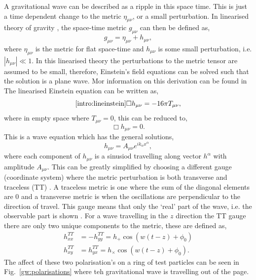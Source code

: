 A gravitational wave can be described as a ripple in this space time.
This is just a time dependent change to the metric $\eta_{\mu\nu}$, or a small perturbation.
In linearised theory of gravity \citep{}, the space-time metric $g_{\mu \nu}$ can then be defined as,
\begin{equation}
    g_{\mu \nu} = \eta_{\mu \nu} + h_{\mu \nu},
\end{equation}
where $ \eta_{\mu \nu}$ is the metric for flat space-time and $h_{\mu \nu}$ is some small perturbation, i.e. $|h_{\mu \nu}| \ll 1$. 
In this linearised theory the perturbations to the metric tensor are assumed to be small, therefore, Einstein's field equations can be solved such that the solution is a plane wave. 
Mor information on this derivation can be found in \citep{Flanagan2005TheTheory,}
The linearised Einstein equation can be written as,
\begin{equation}
\ref{intro:lineinstein}
    \Box h_{\mu \nu} = -16 \pi T_{\mu\nu},
\end{equation}
where in empty space where $T_{\mu \nu} = 0$, this can be reduced to, 
\begin{equation}
    \Box h_{\mu \nu} = 0.
\end{equation}
This is a wave equation which has the general solutions,
\begin{equation}
    h_{\mu\nu} = A_{\mu\nu}e^{ik_{\alpha} x^{\alpha}},
\end{equation}
where each component of $h_{\mu \nu}$ is a sinusiod travelling along vector $h^{\alpha}$ with amplitude $A_{\mu\nu}$.
This can be greatly simplified by choosing a different gauge (coordinate system) where the metric perturbation is both transverse and traceless (TT) \citep{}.
A traceless metric is one where the sum of the diagonal elements are 0 and a transverse metric is when the oscillations are perpendicular to the direction of travel. 
This gauge means that only the `real' part of the wave, i.e. the observable part is shown .
For a wave travelling in the $z$ direction the TT gauge there are only two unique components to the metric, these are defined as,
\begin{equation}
    \begin{split}
        h_{xx}^{TT} &= -h_{yy}^{TT} = h_{+} \cos{\left( w (t - z) + \phi_0\right)} \\
        h_{xy}^{TT} &= h_{yx}^{TT} = h_{\times} \cos{\left( w (t - z) + \phi_0\right)}.
    \end{split}
\end{equation}
The affect of these two polarisation's on a ring of test particles can be seen in Fig.~\ref{gw:polarisations} where teh gravitational wave is travelling out of the page.


